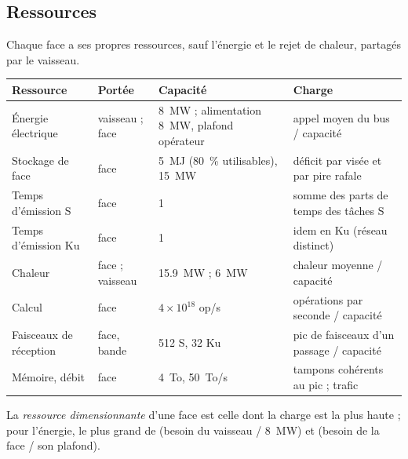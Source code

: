 \documentclass[11pt,a4paper]{article}
\begin{document}
\subsection{Ressources}
Chaque face a ses propres ressources, sauf l'énergie et le rejet de chaleur, partagés par le vaisseau.
\begin{center}
{\small\begin{tabularx}{\linewidth}{@{}lllL@{}}
\toprule
Ressource & Portée & Capacité & Charge\\
\midrule
Énergie électrique & vaisseau ; face & \SI{8}{MW} ; alimentation \SI{8}{MW}, plafond opérateur & appel moyen du bus / capacité\\
Stockage de face & face & \SI{5}{MJ} (\SI{80}{\percent} utilisables), \SI{15}{MW} & déficit par visée et par pire rafale\\
Temps d'émission S & face & 1 & somme des parts de temps des tâches S\\
Temps d'émission Ku & face & 1 & idem en Ku (réseau distinct)\\
Chaleur & face ; vaisseau & \SI{15.9}{MW} ; \SI{6}{MW} & chaleur moyenne / capacité\\
Calcul & face & $4\times10^{18}$ op/s & opérations par seconde / capacité\\
Faisceaux de réception & face, bande & 512 S, 32 Ku & pic de faisceaux d'un passage / capacité\\
Mémoire, débit & face & \SI{4}{To}, \SI{50}{To/s} & tampons cohérents au pic ; trafic\\
\bottomrule
\end{tabularx}}
\end{center}
La \emph{ressource dimensionnante} d'une face est celle dont la charge est la plus haute ; pour l'énergie, le plus grand
de (besoin du vaisseau / \SI{8}{MW}) et (besoin de la face / son plafond).
\end{document}
